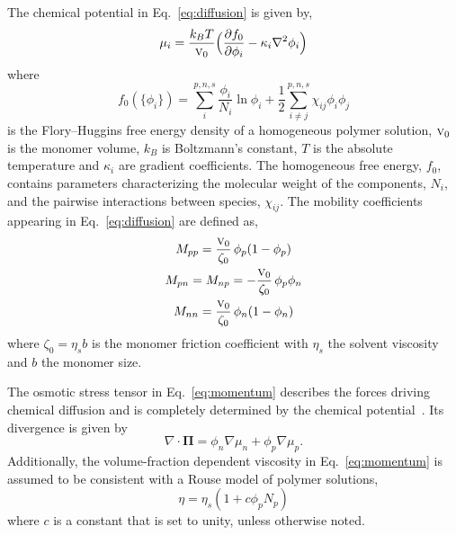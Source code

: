 \documentclass[journal=mamobx, layout=twocolumn]{achemso}
\begin{document}
The chemical potential in Eq.~\ref{eq:diffusion} is given by,
\begin{equation}
  \mu_{i} = \frac{k_{B} T}{\textsc{v}_{0}} \Big ( \frac{\partial f_{0}}{\partial \phi_{i}} - \kappa_{i} \nabla^{2} \phi_{i} \Big ) \label{eq:chem_pot}
\end{equation}
where 
\begin{equation}
f_{0}(\{\phi_{i}\}) = \sum_{i}^{p,n,s} \frac{\phi_{i}}{N_{i}} \ln \phi_{i} + \frac{1}{2} \sum_{i \ne j}^{p,n,s} \chi_{ij} \phi_{i} \phi_{j} \label{eq:homo_free_energy}
\end{equation}
is the Flory--Huggins free energy density of a homogeneous polymer solution, $\textsc{v}_{0}$ is the monomer volume, $k_{B}$ is Boltzmann's constant, $T$ is the absolute temperature and $\kappa_{i}$ are gradient coefficients.
The homogeneous free energy, $f_{0}$, contains parameters characterizing the molecular weight of the components, $N_{i}$, and the pairwise interactions between species, $\chi_{ij}$.
The mobility coefficients appearing in Eq.~\ref{eq:diffusion} are defined as,
\begin{subequations}
\begin{gather}
  M_{pp} = \frac{\textsc{v}_{0}}{\zeta_{0}} \, \phi_{p} (1-\phi_{p}) \\
  M_{pn} = M_{np} = - \frac{\textsc{v}_{0}}{\zeta_{0}} \, \phi_{p} \phi_{n} \\
  M_{nn} = \frac{\textsc{v}_{0}}{\zeta_{0}} \, \phi_{n} (1-\phi_{n}) \label{eq:mobility}
\end{gather}
\end{subequations}
where $\zeta_{0} = \eta_{s} b$ is the monomer friction coefficient with $\eta_{s}$ the solvent viscosity and $b$ the monomer size.

The osmotic stress tensor in Eq.~\ref{eq:momentum} describes the forces driving chemical diffusion and is completely determined by the chemical potential~\cite{Tanaka2000, Doi1992}.
Its divergence is given by~\cite{Tree2017}
\begin{equation} \label{eq:div_osmotic_stress}
\nabla \cdot \bm{\Pi} = \phi_{n} \nabla \mu_{n} + \phi_{p} \nabla \mu_{p} \textrm{.}
\end{equation}
Additionally, the volume-fraction dependent viscosity in Eq.~\ref{eq:momentum} is assumed to be consistent with a Rouse model of polymer solutions,
\begin{equation}
\eta = \eta_{s} (1 + c \phi_{p} N_{p})
\end{equation}
where $c$ is a constant that is set to unity, unless otherwise noted.
\end{document}
